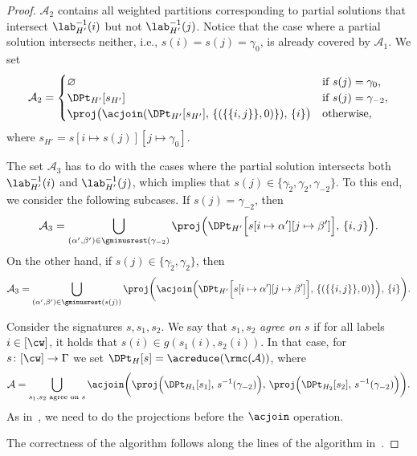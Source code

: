 \begin{proof}
    $\mathcal{A}_2$ contains all weighted partitions corresponding to partial solutions that
    intersect $\lab^{-1}_{H'}(i)$ but not $\lab^{-1}_{H'}(j)$.
    Notice that the case where a partial solution intersects neither,
    i.e., $s(i) = s(j) = \gamma_0$, is already covered by $\mathcal{A}_1$.
    We set
    \[
        \mathcal{A}_2 =
            \begin{cases}
                \varnothing         &\text{if $s(j) = \gamma_0$,}\\
                \DPt_{H'}[s_{H'}]        &\text{if $s(j) = \gamma_{-2}$},\\
                \proj\big(
                    \acjoin( \DPt_{H'}[s_{H'}], \,
                        \{ ( \{\{i,j\}\},0) \}), \,
                    \{i\}
                \big)               &\text{otherwise},
            \end{cases}
    \]
    where $s_{H'} = s[i \mapsto s(j)][j \mapsto \gamma_0]$.

    The set $\mathcal{A}_3$ has to do with the cases where the partial solution intersects
    both $\lab^{-1}_{H'}(i)$ and $\lab^{-1}_{H'}(j)$, which implies that $s(j) \in \{ \gamma_{\tilde{2}}, \gamma_2, \gamma_{-2}\}$.
    To this end, we consider the following subcases.
    If $s(j) = \gamma_{-2}$, then
    \[
        \mathcal{A}_3 = \bigcup_{(\alpha',\beta') \in \gminusrest(\gamma_{-2})}
                \proj\Big( \DPt_{H'} \Bigl[ s[i \mapsto \alpha'][j \mapsto \beta'] \Bigr] , \, \{i,j\} \Big).
    \]
    On the other hand, if $s(j) \in \{ \gamma_{\tilde{2}}, \gamma_2 \}$, then
    \[
        \mathcal{A}_3 = \bigcup_{(\alpha',\beta') \in \gminusrest(s(j))}
                \proj\bigg(
                    \acjoin \Big(
                        \DPt_{H'} \Bigl[ s[i \mapsto \alpha'][j \mapsto \beta'] \Bigr], \,
                        \{ ( \{\{i,j\}\},0) \} \Big), \,
                    \{i\}
                \bigg).
    \]

    Consider the signatures $s, s_1, s_2$.
    We say that $s_1,s_2$ \emph{agree on $s$} if for all labels $i \in [\cw]$,
    it holds that $s(i) \in g(s_1(i), s_2(i))$.
    In that case, for $s \colon [\cw] \to \Gamma$ we set $\DPt_H[s] = \acreduce(\rmc(\mathcal{A}))$,
    where
    \[
        \mathcal{A} = \bigcup_{s_1,s_2 \text{ agree on } s}
            \acjoin \bigg(
                \proj \Big( \DPt_{H_1}[s_1], \, s^{-1}(\gamma_{-2}) \Big), \,
                \proj \Big( \DPt_{H_2}[s_2], \, s^{-1}(\gamma_{-2}) \Big)
            \bigg).
    \]
    As in~\cite{tcs/BergougnouxK19},
    we need to do the projections before the $\acjoin$ operation.

    The correctness of the algorithm follows along the lines of the {\FVS} algorithm in~\cite{tcs/BergougnouxK19}.
\end{proof}

